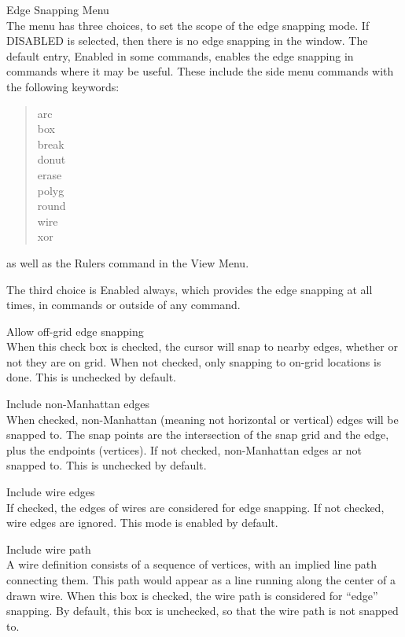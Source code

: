 \begin{description}
\item{\cb Edge Snapping Menu}\\
The menu has three choices, to set the scope of the edge snapping
mode.  If {\cb DISABLED} is selected, then there is no edge snapping
in the window.  The default entry, {\cb Enabled in some commands},
enables the edge snapping in commands where it may be useful.  These
include the side menu commands with the following keywords:

\begin{quote} \vt
arc\\
box\\
break\\
donut\\
erase\\
polyg\\
round\\
wire\\
xor
\end{quote}

as well as the {\cb Rulers} command in the {\cb View Menu}.

The third choice is {\cb Enabled always}, which provides the edge
snapping at all times, in commands or outside of any command.

\item{\cb Allow off-grid edge snapping}\\
When this check box is checked, the cursor will snap to nearby edges,
whether or not they are on grid.  When not checked, only snapping to
on-grid locations is done.  This is unchecked by default.

\item{\cb Include non-Manhattan edges}\\
When checked, non-Manhattan (meaning not horizontal or vertical) edges
will be snapped to.  The snap points are the intersection of the snap
grid and the edge, plus the endpoints (vertices).  If not checked,
non-Manhattan edges ar not snapped to.  This is unchecked by default.

\item{\cb Include wire edges}\\
If checked, the edges of wires are considered for edge snapping.  If
not checked, wire edges are ignored.  This mode is enabled by default.

\item{\cb Include wire path}\\
A wire definition consists of a sequence of vertices, with an implied
line path connecting them.  This path would appear as a line running
along the center of a drawn wire.  When this box is checked, the wire
path is considered for ``edge'' snapping.  By default, this box is
unchecked, so that the wire path is not snapped to.
\end{description}

